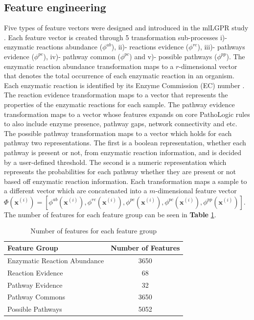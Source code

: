 \documentclass[sn-mathphys,Numbered]{sn-jnl}%
\theoremstyle{thmstyleone}%
\theoremstyle{thmstyletwo}%
\theoremstyle{thmstylethree}%
\begin{document}
\subsection{Feature engineering}
Five types of feature vectors were designed and introduced in the mlLGPR study \cite{m.a.basherMetabolicPathwayInference2020}. 
Each feature vector is created through 5 transformation sub-processes i)- enzymatic reactions abundance ($\phi^{ab}$), ii)- reactions evidence ($\phi^{re}$), iii)- pathways evidence ($\phi^{pe}$), iv)- pathway common ($\phi^{pc}$) and v)- possible pathways ($\phi^{pp}$). 
The enzymatic reaction abundance transformation maps to a $r$-dimensional vector that denotes the total occurrence of each enzymatic reaction in an organism. 
Each enzymatic reaction is identified by its Enzyme Commission (EC) number \cite{bairochENZYMEDatabase20002000}. 
The reaction evidence transformation maps to a vector that represents the properties of the enzymatic reactions for each sample. 
The pathway evidence transformation maps to a vector whose features expands on core PathoLogic rules to also include enzyme presence, pathway gaps, network connectivity and etc. %
The possible pathway transformation maps to a vector which holds for each pathway two representations.
The first is a boolean representation, whether each pathway is present or not, from enzymatic reaction information, and is decided by a user-defined threshold.
The second is a numeric representation which represents the probabilities for each pathway whether they are present or not based off enzymatic reaction information.
Each transformation maps a sample to a different vector which are concatenated into a $m$-dimensional feature vector $\Phi(\textbf{x}^{(i)})=[\phi^{ab}(\textbf{x}^{(i)}),\phi^{re}(\textbf{x}^{(i)}),\phi^{pe}(\textbf{x}^{(i)}), \phi^{pc}(\textbf{x}^{(i)}), \phi^{pp}(\textbf{x}^{(i)})]$.
The number of features for each feature group can be seen in \textbf{Table} \ref{table:2}.

\begin{table}[ht]
\caption{Number of features for each feature group}
\label{table:2}
\begin{tabular}{l c}
 \hline
 \textbf{Feature Group}&\textbf{Number of Features}\\
 \hline
 Enzymatic Reaction Abundance&3650\\
 Reaction Evidence&68\\
 Pathway Evidence&32\\
 Pathway Commons&3650\\
 Possible Pathways&5052\\
 \hline 
\end{tabular}
\end{table}
\end{document}
